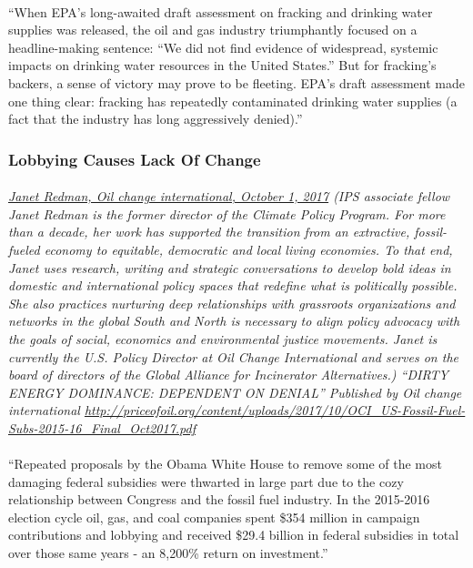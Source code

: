 \documentclass{article}
\begin{document}
\paragraph{}
``When EPA’s long-awaited draft assessment on fracking and drinking water supplies was released, the oil and gas industry triumphantly focused on a headline-making sentence: “We did not find evidence of widespread, systemic impacts on drinking water resources in the United States.” But for fracking’s backers, a sense of victory may prove to be fleeting. EPA’s draft assessment made one thing clear: fracking has repeatedly contaminated drinking water supplies (a fact that the industry has long aggressively denied).”

\subsubsection{Lobbying Causes Lack Of Change}
\paragraph{}
\small
\textit{
\underline{Janet Redman, Oil change international, October 1, 2017}
(IPS associate fellow Janet Redman is the former director of the Climate Policy Program. For more than a decade, her work has supported the transition from an extractive, fossil-fueled economy to equitable, democratic and local living economies. To that end, Janet uses research, writing and strategic conversations to develop bold ideas in domestic and international policy spaces that redefine what is politically possible. She also practices nurturing deep relationships with grassroots organizations and networks in the global South and North is necessary to align policy advocacy with the goals of social, economics and environmental justice movements. Janet is currently the U.S. Policy Director at Oil Change International and serves on the board of directors of the Global Alliance for Incinerator Alternatives.) “DIRTY ENERGY DOMINANCE: DEPENDENT ON DENIAL” Published by Oil change international
\url{http://priceofoil.org/content/uploads/2017/10/OCI_US-Fossil-Fuel-Subs-2015-16_Final_Oct2017.pdf }}
\normalsize

\paragraph{}
``Repeated proposals by the Obama White House to remove some of the most damaging federal subsidies were thwarted in large part due to the cozy relationship between Congress and the fossil fuel industry. In the 2015-2016 election cycle oil, gas, and coal companies spent \$354 million in campaign contributions and lobbying and received \$29.4 billion in federal subsidies in total over those same years - an 8,200\% return on investment.”
\end{document}
